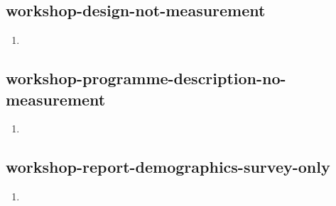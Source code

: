 \documentclass{article}
\begin{document}
\subsection{workshop-design-not-measurement}
\begin{enumerate}
\item {}
\end{enumerate}

\subsection{workshop-programme-description-no-measurement}
\begin{enumerate}
\item {}
\end{enumerate}

\subsection{workshop-report-demographics-survey-only}
\begin{enumerate}
\item {}
\end{enumerate}
\end{document}
